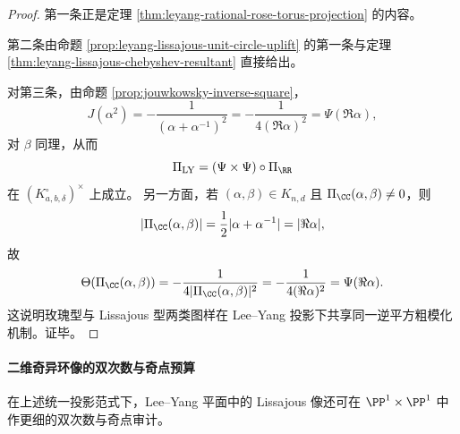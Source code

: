 \begin{proof}
第一条正是定理 \ref{thm:leyang-rational-rose-torus-projection} 的内容。

第二条由命题 \ref{prop:leyang-lissajous-unit-circle-uplift} 的第一条与定理 \ref{thm:leyang-lissajous-chebyshev-resultant} 直接给出。

对第三条，由命题 \ref{prop:jouwkowsky-inverse-square}，
\[
J(\alpha^2)=-\frac{1}{(\alpha+\alpha^{-1})^2}
=-\frac{1}{4(\Re\alpha)^2}
=\Psi(\Re\alpha),
\]
对 \(\beta\) 同理，从而
\[
\Pi_{\mathrm{LY}}=(\Psi\times\Psi)\circ\Pi_{\RR}
\]
在 \((K_{a,b,\delta}^{\circ})^{\times}\) 上成立。
另一方面，若 \((\alpha,\beta)\in K_{n,d}\) 且 \(\Pi_{\CC}(\alpha,\beta)\neq 0\)，则
\[
|\Pi_{\CC}(\alpha,\beta)|
=\frac12|\alpha+\alpha^{-1}|
=|\Re\alpha|,
\]
故
\[
\Theta(\Pi_{\CC}(\alpha,\beta))
=-\frac{1}{4|\Pi_{\CC}(\alpha,\beta)|^2}
=-\frac{1}{4(\Re\alpha)^2}
=\Psi(\Re\alpha).
\]
这说明玫瑰型与 Lissajous 型两类图样在 Lee--Yang 投影下共享同一逆平方粗模化机制。证毕。
\end{proof}

\paragraph{二维奇异环像的双次数与奇点预算}
在上述统一投影范式下，Lee--Yang 平面中的 Lissajous 像还可在 \(\PP^1\times\PP^1\) 中作更细的双次数与奇点审计。



